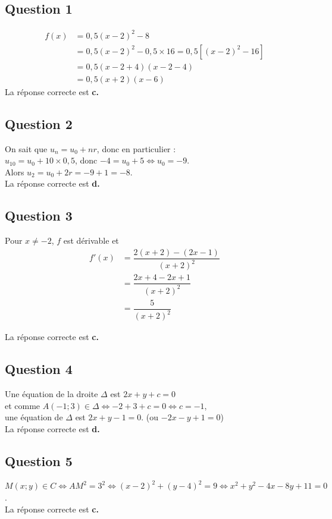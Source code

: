 \subsection*{Question 1}
	
	
\begin{align*}
	f(x)& = 0,5(x - 2)^2 - 8\\
	& = 0,5(x - 2)^2 - 0,5 \times 16 = 0,5 \left[ (x - 2)^2 - 16 \right] \\
	&= 0,5(x - 2 + 4)(x - 2 - 4)\\
	& = 0,5(x + 2)(x - 6)
\end{align*}
La réponse correcte est \textbf{c.}
	
	\subsection*{Question 2}
On sait que $u_n = u_0 + nr$, donc en particulier :\\
$u_{10} = u_0 + 10 \times 0,5$, donc $-4 = u_0 + 5 \iff u_0 = -9$.\\
 Alors $u_2 = u_0 + 2r = -9 + 1 = -8$.\\
La réponse correcte est \textbf{d.}
	
	\subsection*{Question 3}
	
Pour $x \neq -2$, $f$ est dérivable et
\begin{align*}
	f'(x) &= \dfrac{2(x + 2) - (2x - 1)}{(x + 2)^2}\\
	& = \dfrac{2x + 4 - 2x + 1}{(x + 2)^2} \\
	&= \dfrac{5}{(x + 2)^2}
\end{align*}
	
	La réponse correcte est \textbf{c.}
	
	\subsection*{Question 4}
Une équation de la droite $\Delta$ est $2x + y + c = 0$ \\
et comme $A(-1 ; 3) \in \Delta \iff -2 + 3 + c = 0 \iff c = -1$, \\
une équation de $\Delta$ est $2x + y - 1 = 0$. (ou $-2x - y + 1 = 0$)\\
La réponse correcte est \textbf{d.}
	
	\subsection*{Question 5}
$M(x ; y) \in C \iff AM^2 = 3^2 \iff (x - 2)^2 + (y - 4)^2 = 9 \iff x^2 + y^2 - 4x - 8y + 11 = 0$.\\La réponse correcte est \textbf{c.}
